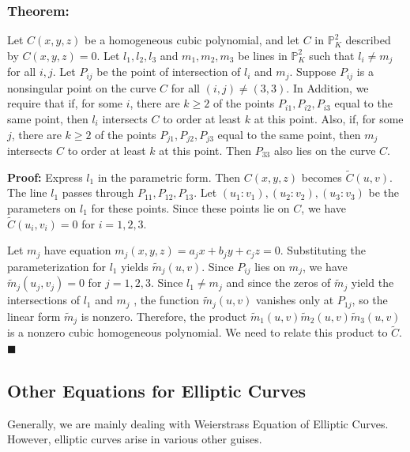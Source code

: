 \documentclass[a4paper, 12pt]{article}
\begin{document}
\subsubsection{Theorem: }
Let $C(x,y,z)$ be a homogeneous cubic polynomial, and let $C$ in $\mathbb{P}_K^2$ described by $C(x,y,z)=0$. Let $l_1,l_2,l_3$ and $m_1,m_2,m_3$ be lines in $\mathbb{P}_K^2$ such that $l_i \neq m_j$ for all $i,j$. Let $P_{ij}$ be the point of intersection of $l_i$ and $m_j$. Suppose $P_{ij}$ is a nonsingular point on the curve $C$ for all $(i,j) \neq (3,3)$.\newline
In Addition, we require that if, for some $i$, there are $k \geq 2$ of the points $P_{i1},P_{i2},P_{i3}$ equal to the same point, then $l_i$ intersects $C$ to order at least $k$ at this point. Also, if, for some $j$, there are $k \geq 2$ of the points $P_{j1},P_{j2},P_{j3}$ equal to the same point, then $m_j$ intersects $C$ to order at least $k$ at this point. Then $P_{33}$ also lies on the curve $C$.\par
\textbf{Proof: } Express $l_1$ in the parametric form. Then $C(x,y,z)$ becomes $\tilde{C}(u,v)$. The line $l_1$ passes through $P_{11},P_{12},P_{13}$. Let $(u_1:v_1),(u_2:v_2),(u_3:v_3)$ be the parameters on $l_1$ for these points. Since these points lie on $C$, we have $\tilde{C}(u_i,v_i) = 0$ for $i=1,2,3$.\par
Let $m_j$ have equation $m_j(x,y,z)=a_jx+b_jy+c_jz=0$. Substituting the parameterization for $l_1$ yields $\tilde{m}_j(u,v).$ Since $P_{ij}$ lies on $m_j$, we have $\tilde{m}_j(u_j,v_j)=0$ for $j=1,2,3$. \newpage Since $l_1 \neq m_j$ and since the zeros of $\tilde{m}_j$ yield the intersections of $l_1$ and $m_j$ , the function $\tilde{m}_j(u,v)$ vanishes only at $P_{1j}$, so the linear form $\tilde{m}_j$ is nonzero. Therefore, the product $\tilde{m}_1(u,v)\tilde{m}_2(u,v)\tilde{m}_3(u,v)$ is a nonzero cubic homogeneous polynomial. We need to relate this product to $\tilde{C}$.$\blacksquare$
\subsection{Other Equations for Elliptic Curves}
Generally, we are mainly dealing with Weierstrass Equation of Elliptic Curves. However, elliptic curves arise in various other guises.
\end{document}
